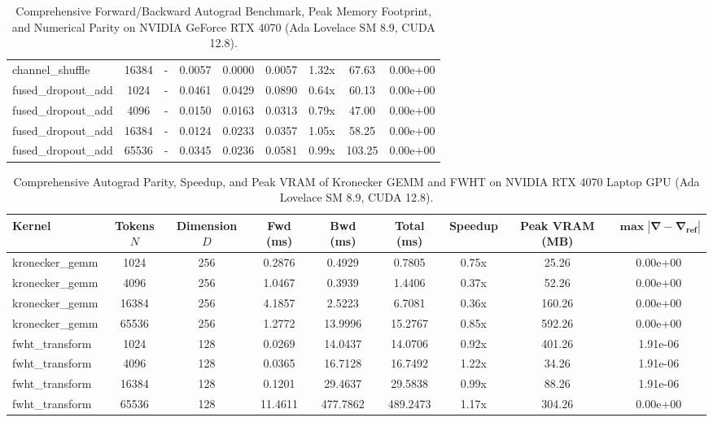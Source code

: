 \documentclass[journal]{IEEEtran}
\begin{document}
\begin{table}[t]
\begin{tabular}{lcccccccc}
channel\_shuffle & 16384 & - & 0.0057 & 0.0000 & 0.0057 & 1.32x & 67.63 & 0.00e+00 \\
fused\_dropout\_add & 1024 & - & 0.0461 & 0.0429 & 0.0890 & 0.64x & 60.13 & 0.00e+00 \\
fused\_dropout\_add & 4096 & - & 0.0150 & 0.0163 & 0.0313 & 0.79x & 47.00 & 0.00e+00 \\
fused\_dropout\_add & 16384 & - & 0.0124 & 0.0233 & 0.0357 & 1.05x & 58.25 & 0.00e+00 \\
fused\_dropout\_add & 65536 & - & 0.0345 & 0.0236 & 0.0581 & 0.99x & 103.25 & 0.00e+00 \\
\bottomrule
\end{tabular}
\caption{Comprehensive Forward/Backward Autograd Benchmark, Peak Memory Footprint, and Numerical Parity on NVIDIA GeForce RTX 4070 (Ada Lovelace SM 8.9, CUDA 12.8).}
\label{tab:gemm_norm_benchmarks}
\end{table}

\begin{table}[t]
\centering
\small
\begin{tabular}{lcccccccc}
\toprule
\textbf{Kernel} & \textbf{Tokens $N$} & \textbf{Dimension $D$} & \textbf{Fwd (ms)} & \textbf{Bwd (ms)} & \textbf{Total (ms)} & \textbf{Speedup} & \textbf{Peak VRAM (MB)} & $\mathbf{\max |\nabla - \nabla_{\text{ref}}|}$ \\
\midrule
kronecker\_gemm & 1024 & 256 & 0.2876 & 0.4929 & 0.7805 & 0.75x & 25.26 & 0.00e+00 \\
kronecker\_gemm & 4096 & 256 & 1.0467 & 0.3939 & 1.4406 & 0.37x & 52.26 & 0.00e+00 \\
kronecker\_gemm & 16384 & 256 & 4.1857 & 2.5223 & 6.7081 & 0.36x & 160.26 & 0.00e+00 \\
kronecker\_gemm & 65536 & 256 & 1.2772 & 13.9996 & 15.2767 & 0.85x & 592.26 & 0.00e+00 \\
fwht\_transform & 1024 & 128 & 0.0269 & 14.0437 & 14.0706 & 0.92x & 401.26 & 1.91e-06 \\
fwht\_transform & 4096 & 128 & 0.0365 & 16.7128 & 16.7492 & 1.22x & 34.26 & 1.91e-06 \\
fwht\_transform & 16384 & 128 & 0.1201 & 29.4637 & 29.5838 & 0.99x & 88.26 & 1.91e-06 \\
fwht\_transform & 65536 & 128 & 11.4611 & 477.7862 & 489.2473 & 1.17x & 304.26 & 0.00e+00 \\
\bottomrule
\end{tabular}
\caption{Comprehensive Autograd Parity, Speedup, and Peak VRAM of Kronecker GEMM and FWHT on NVIDIA RTX 4070 Laptop GPU (Ada Lovelace SM 8.9, CUDA 12.8).}
\label{tab:kronecker_fwht_benchmarks}
\end{table}
\end{document}
